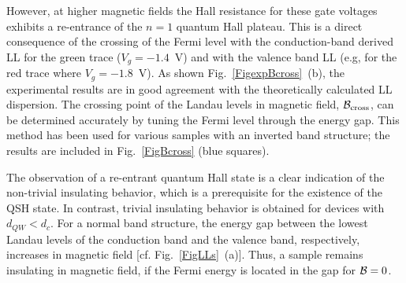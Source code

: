 \documentclass{article}
\begin{document}
However, at higher magnetic fields the Hall resistance for these
gate voltages exhibits a re-entrance of the $n=1$ quantum Hall
plateau. This is a direct consequence of the crossing of the Fermi
level with the conduction-band derived LL for the green trace
($V_g=-1.4$~V) and with the valence band LL (e.g, for the red trace
where $V_g=-1.8$~V). As shown Fig.~\ref{FigexpBcross}~(b), the
experimental results are in good agreement with the theoretically
calculated LL dispersion. The crossing point of the Landau levels in
magnetic field, ${\cal{B}}_{\rm cross}$, can be determined
accurately by tuning the Fermi level through the energy gap. This
method has been used for various samples with an inverted band
structure; the results are included in Fig.~\ref{FigBcross} (blue
squares).

The observation of a re-entrant quantum Hall state is a clear
indication of the non-trivial insulating behavior, which is a
prerequisite for the existence of the QSH state. In contrast,
trivial insulating behavior is obtained for devices with
$d_{QW}<d_{c}$. For a normal band structure, the energy gap between
the lowest Landau levels of the conduction band and the valence
band, respectively, increases in magnetic field [cf.
Fig.~\ref{FigLLs}~(a)]. Thus, a sample remains insulating in
magnetic field, if the Fermi energy is located in the gap for
${\cal{B}}=0$.
\end{document}

